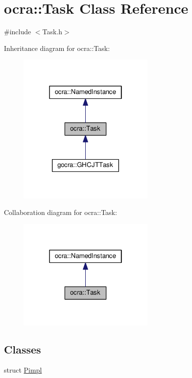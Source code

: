\hypertarget{classocra_1_1Task}{}\section{ocra\+:\+:Task Class Reference}
\label{classocra_1_1Task}


{\ttfamily \#include $<$Task.\+h$>$}



Inheritance diagram for ocra\+:\+:Task\+:
\nopagebreak
\begin{figure}[H]
\begin{center}
\leavevmode
\includegraphics[width=190pt]{dd/d2a/classocra_1_1Task__inherit__graph}
\end{center}
\end{figure}


Collaboration diagram for ocra\+:\+:Task\+:
\nopagebreak
\begin{figure}[H]
\begin{center}
\leavevmode
\includegraphics[width=190pt]{dd/d65/classocra_1_1Task__coll__graph}
\end{center}
\end{figure}
\subsection*{Classes}
\begin{DoxyCompactItemize}
\item 
struct \hyperlink{structocra_1_1Task_1_1Pimpl}{Pimpl}
\end{DoxyCompactItemize}
